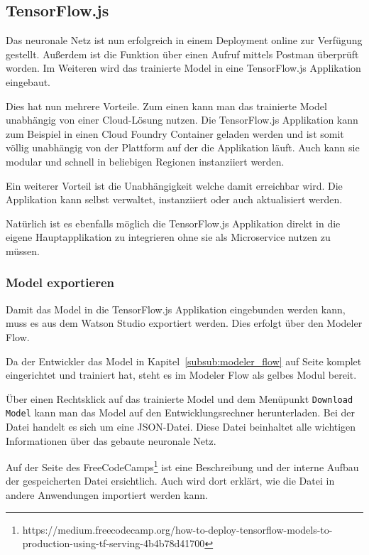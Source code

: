 \subsection{TensorFlow.js}
Das neuronale Netz ist nun erfolgreich in einem Deployment online zur Verfügung gestellt. Außerdem ist die Funktion
über einen Aufruf mittels Postman überprüft worden. Im Weiteren wird das trainierte Model in eine TensorFlow.js
Applikation eingebaut.

Dies hat nun mehrere Vorteile. Zum einen kann man das trainierte Model unabhängig von einer Cloud-Lösung nutzen. Die
TensorFlow.js Applikation kann zum Beispiel in einen Cloud Foundry Container geladen werden und ist somit völlig
unabhängig von der Plattform auf der die Applikation läuft. Auch kann sie modular und schnell in beliebigen Regionen
instanziiert werden.

Ein weiterer Vorteil ist die Unabhängigkeit welche damit erreichbar wird. Die Applikation kann selbst verwaltet,
instanziiert oder auch aktualisiert werden.

Natürlich ist es ebenfalls möglich die TensorFlow.js Applikation direkt in die eigene Hauptapplikation zu integrieren
ohne sie als Microservice nutzen zu müssen.

\subsubsection{Model exportieren}
Damit das Model in die TensorFlow.js Applikation eingebunden werden kann, muss es aus dem Watson Studio exportiert
werden.
Dies erfolgt über den Modeler Flow.

Da der Entwickler das Model in Kapitel~\ref{subsub:modeler_flow} auf Seite\pageref{subsub:modeler_flow} komplet
eingerichtet und trainiert hat, steht es im Modeler Flow als gelbes Modul bereit.

Über einen Rechtsklick auf das trainierte Model und dem Menüpunkt \texttt{Download Model} kann man das Model auf den
Entwicklungsrechner herunterladen. Bei der Datei handelt es sich um eine JSON-Datei. Diese Datei beinhaltet alle wichtigen
Informationen über das gebaute neuronale Netz.

Auf der Seite des
FreeCodeCamps\footnote{https://medium.freecodecamp.org/how-to-deploy-tensorflow-models-to-production-using-tf-serving-4b4b78d41700}
ist eine Beschreibung und der interne Aufbau der gespeicherten Datei ersichtlich. Auch wird dort erklärt, wie die Datei
in andere Anwendungen importiert werden kann.

